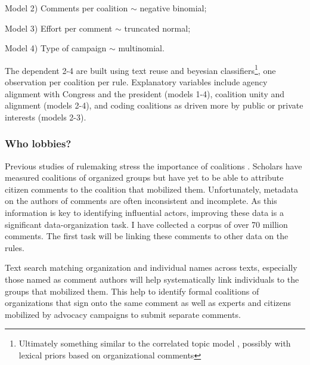 Model 2) Comments per coalition $\sim$ negative binomial; 

Model 3) Effort per comment $\sim$ truncated normal; 

Model 4) Type of campaign $\sim$ multinomial. 

The dependent 2-4 are built using text reuse and beyesian classifiers\footnote{
Ultimately something similar to the correlated topic model \citep{Blei2005}, possibly with lexical priors \citep{Fong2016} based on organizational comments
},
one observation per coalition per rule. Explanatory variables include agency alignment with Congress and the president (models 1-4), coalition unity and alignment (models 2-4), and coding coalitions as driven more by public or private interests (models 2-3).%


\subsubsection{Who lobbies?}
Previous studies of rulemaking stress the importance of coalitions \citep{Yackee2006a}. Scholars have measured coalitions of organized groups but have yet to be able to attribute citizen comments to the coalition that mobilized them.
Unfortunately, metadata on the authors of comments are often inconsistent and incomplete. As this information is key to identifying influential actors, improving these data is a significant data-organization task. I have collected a corpus of over 70 million comments. The first task will be linking these comments to other data on the rules. 

Text search matching organization and individual names across texts, especially those named as comment authors will help systematically link individuals to the groups that mobilized them.%
This help to identify formal coalitions of organizations that sign onto the same comment as well as experts and citizens mobilized by advocacy campaigns to submit separate comments.

